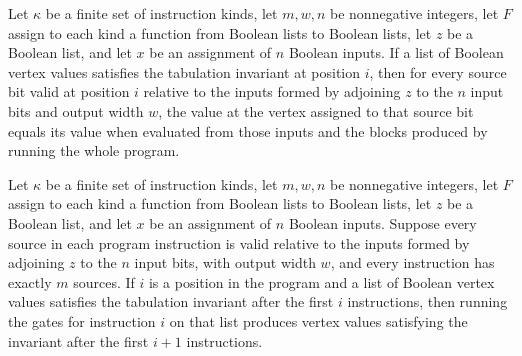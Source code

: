 \begin{theorem}
\label{BoolCircuit.tabSrc_eval}
\leanok
{}
Let $\kappa$ be a finite set of instruction kinds, let $m,w,n$ be nonnegative integers,
let $F$ assign to each kind a function from Boolean lists to Boolean lists, let $z$ be a
Boolean list, and let $x$ be an assignment of $n$ Boolean inputs. If a list of Boolean
vertex values satisfies the tabulation invariant at position $i$, then for every source
bit valid at position $i$ relative to the inputs formed by adjoining $z$ to the $n$
input bits and output width $w$, the value at the vertex assigned to that source bit
equals its value when evaluated from those inputs and the blocks produced by running the
whole program.
\end{theorem}

\begin{theorem}
\label{BoolCircuit.tabInv_succ}
\leanok
{}
Let $\kappa$ be a finite set of instruction kinds, let $m,w,n$ be nonnegative integers,
let $F$ assign to each kind a function from Boolean lists to Boolean lists, let $z$ be a
Boolean list, and let $x$ be an assignment of $n$ Boolean inputs. Suppose every source
in each program instruction is valid relative to the inputs formed by adjoining $z$ to
the $n$ input bits, with output width $w$, and every instruction has exactly $m$
sources. If $i$ is a position in the program and a list of Boolean vertex values
satisfies the tabulation invariant after the first $i$ instructions, then running the
gates for instruction $i$ on that list produces vertex values satisfying the invariant
after the first $i+1$ instructions.
\end{theorem}

